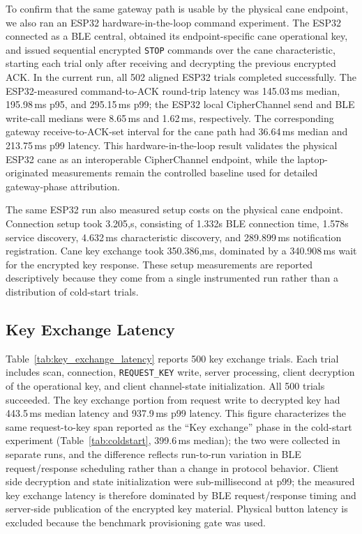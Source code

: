 \documentclass[journal]{IEEEtran}
\begin{document}
To confirm that the same gateway path is usable by the physical cane endpoint, we also ran an ESP32 hardware-in-the-loop command experiment. The ESP32 connected as a BLE central, obtained its endpoint-specific cane operational key, and issued sequential encrypted \texttt{STOP} commands over the cane characteristic, starting each trial only after receiving and decrypting the previous encrypted ACK. In the current run, all 502 aligned ESP32 trials completed successfully. The ESP32-measured command-to-ACK round-trip latency was 145.03\,ms median, 195.98\,ms p95, and 295.15\,ms p99; the ESP32 local CipherChannel send and BLE write-call medians were 8.65\,ms and 1.62\,ms, respectively. The corresponding gateway receive-to-ACK-set interval for the cane path had 36.64\,ms median and 213.75\,ms p99 latency. This hardware-in-the-loop result validates the physical ESP32 cane as an interoperable CipherChannel endpoint, while the laptop-originated measurements remain the controlled baseline used for detailed gateway-phase attribution.

The same ESP32 run also measured setup costs on the physical cane endpoint. Connection setup took 3.205,s, consisting of 1.332s BLE connection time, 1.578s service discovery, 4.632\,ms characteristic discovery, and 289.899\,ms notification registration. Cane key exchange took 350.386,ms, dominated by a 340.908\,ms wait for the encrypted key response. These setup measurements are reported descriptively because they come from a single instrumented run rather than a distribution of cold-start trials.

\subsection{Key Exchange Latency}

Table~\ref{tab:key_exchange_latency} reports 500 key exchange trials. Each trial includes scan, connection, \texttt{REQUEST\_KEY} write, server processing, client decryption of the operational key, and client channel-state initialization. All 500 trials succeeded. The key exchange portion from request write to decrypted key had 443.5\,ms  median latency and 937.9\,ms  p99 latency. This figure characterizes the same request-to-key span reported as the ``Key exchange'' phase in the cold-start experiment (Table~\ref{tab:coldstart}, 399.6\,ms  median); the two were collected in separate runs, and the difference reflects run-to-run variation in BLE request/response scheduling rather than a change in protocol behavior. Client side decryption and state initialization were sub-millisecond at p99; the measured key exchange latency is therefore dominated by BLE request/response timing and server-side publication of the encrypted key material. Physical button latency is excluded because the benchmark provisioning gate was used.
\end{document}
